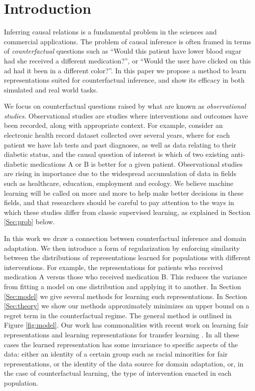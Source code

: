 \section{Introduction}

Inferring causal relations is a fundamental problem in the sciences and commercial applications. The problem of causal inference is often framed in terms of \emph{counterfactual} questions \citep{lewis1973causation,rubin1974estimating,pearl2009causality} such as ``Would this patient have lower blood sugar had she received a different medication?'', or ``Would the user have clicked on this ad had it been in a different color?''.
In this paper we propose a method to learn representations suited for counterfactual inference, and show its efficacy in both simulated and real world tasks.

We focus on counterfactual questions raised by what are known as \emph{observational studies}. Observational studies are studies where interventions and outcomes have been recorded, along with appropriate context. For example, consider an electronic health record dataset collected over several years, where for each patient we have lab tests and past diagnoses, as well as data relating to their diabetic status, and the causal question of interest is which of two existing anti-diabetic medications A or B is better for a given patient. Observational studies are rising in importance due to the widespread accumulation of data in fields such as healthcare, education, employment and ecology. We believe machine learning will be called on more and more to help make better decisions in these fields, and that researchers should be careful to pay attention to the ways in which these studies differ from classic supervised learning, as explained in Section \ref{Sec:prob} below.

In this work we draw a connection between counterfactual inference and domain adaptation. We then introduce a form of regularization by enforcing similarity between the distributions of representations learned for populations with different interventions. For example, the representations for patients who received medication A versus those who received medication B. This reduces the variance from fitting a model on one distribution and applying it to another. In Section \ref{Sec:model} we give several methods for learning such representations. In Section \ref{Sec:theory} we show our methods approximately minimizes an upper bound on a regret term in the counterfactual regime. The general method is outlined in Figure \ref{fig:model}.
Our work has commonalities with recent work on learning fair representations \citep{zemel2013learning,louizos2015variational} and learning representations for transfer learning \citep{ben2007analysis,gani2015domain}. In all these cases the learned representation has some invariance to specific aspects of the data: either an identity of a certain group such as racial minorities for fair representations, or the identity of the data source for domain adaptation, or, in the case of counterfactual learning, the type of intervention enacted in each population.

